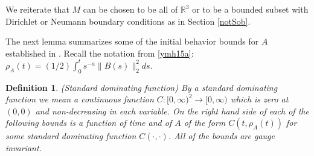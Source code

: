 \documentclass[12pt]{article}
\newtheorem{definition}[theorem]{Definition}
\def \R{\mathbb R}
\def \eref{\eqref}
\numberwithin{equation}{section}
\begin{document}
  We reiterate that $M$ can be chosen  to be all of $\R^3$ or to be a bounded subset with
  Dirichlet  or Neumann boundary conditions as in Section  \ref{notSob}.  
    
    The next lemma summarizes some  of the initial behavior bounds for $A$ 
established in \cite{G70}. Recall the notation from \eref{ymh15a}: 
$ \rho_A(t) = (1/2)\int_0^t s^{-a} \| B(s)\|_2^2 ds$.


          \begin{definition}\label{defsbf} {\rm   (Standard dominating function)
By a {\it standard dominating function} we mean a continuous function 
$C:[0, \infty)^2 \rightarrow [0, \infty)$ which is zero at $(0,0)$ and non-decreasing in each
variable.  On the right hand side of each of the following bounds is 
a function of time and of $A$ of the form $C(t, \rho_A(t))$ for some standard dominating 
 function $C(\cdot, \cdot)$.
 All of the  bounds are gauge invariant. 
 }
\end{definition}
\end{document}
